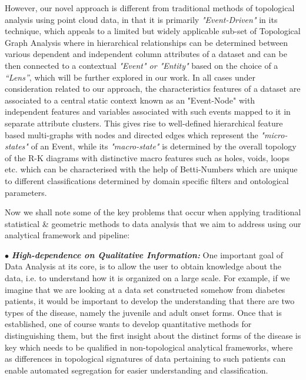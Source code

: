 However, our novel approach is different from traditional methods of topological analysis using point cloud data, in that it is primarily \textit{"Event-Driven"} in its technique, which appeals to a limited but widely applicable sub-set of Topological Graph Analysis where in hierarchical relationships can be determined between various dependent and independent column attributes of a dataset and can be then connected to a contextual \textit{"Event" or "Entity"} based on the choice of a \textit{``Lens''}, which will be further explored in our work. In all cases under consideration related to our approach, the  characteristics features of a dataset are associated to a central static context known as an "Event-Node" with independent features and variables associated with such events mapped to it in separate attribute clusters. This gives rise to well-defined hierarchical feature based multi-graphs with nodes and directed edges which represent the \textit{"micro-states"} of an Event, while its \textit{"macro-state"} is determined by the overall topology of the R-K diagrams with distinctive macro features such as holes, voids, loops etc. which can be characterised with the help of  Betti-Numbers which are unique to different classifications determined by domain specific filters and ontological parameters.

Now we shall note some of the key problems that occur when applying traditional statistical \&  geometric methods to data analysis that we aim to address using our analytical framework and pipeline:

$\bullet$ \textbf{\textit{High-dependence on Qualitative Information:}} One important goal of Data Analysis at its core, is to allow the user to obtain knowledge about the data, i.e. to understand how it is organized on a large scale. For example, if we imagine that we are looking at a data set constructed somehow from diabetes patients, it would be important to develop the understanding that there are two types of the disease, namely the juvenile and adult onset forms.\cite{01_GCarlssonEpstein2011}\cite{02.1_GCarlson2004topoEstimation} Once that is established, one of course wants to develop quantitative methods for distinguishing them, but the first insight about the distinct forms of the disease is key which needs to be qualified in non-topological analytical frameworks, where as differences in topological signatures of data pertaining to such patients can enable automated segregation for easier understanding and classification.

